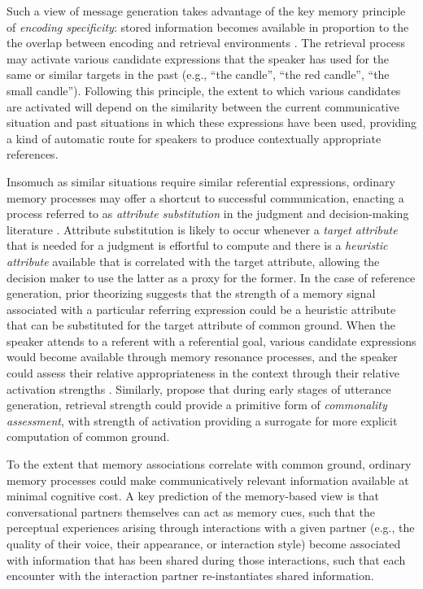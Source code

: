 \documentclass[natbib,doc,a4paper]{apa6}
\begin{document}
Such a view of message generation takes advantage of the key memory principle of \emph{encoding specificity}: stored information becomes available in proportion to the the overlap between encoding and retrieval environments \citep{tulvingthomson73}.  The retrieval process may activate various candidate expressions that the speaker has used for the same or similar targets in the past (e.g., ``the candle'', ``the red candle'', ``the small candle'').  Following this principle, the extent to which various candidates are activated will depend on the similarity between the current communicative situation and past situations in which these expressions have been used, providing a kind of automatic route for speakers to produce contextually appropriate references. 

Insomuch as similar situations require similar referential expressions, ordinary memory processes may offer a shortcut to successful communication, enacting a process referred to as \emph{attribute substitution} in the judgment and decision-making literature \citep{KahnemanFrederick2002}.  Attribute substitution is likely to occur whenever a \emph{target attribute} that is needed for a judgment is effortful to compute and there is a \emph{heuristic attribute} available that is correlated with the target attribute, allowing the decision maker to use the latter as a proxy for the former.  In the case of reference generation, prior theorizing suggests that the strength of a memory signal associated with a particular referring expression could be a heuristic attribute that can be substituted for the target attribute of common ground.  When the speaker attends to a referent with a referential goal, various candidate expressions would become available through memory resonance processes, and the speaker could assess their relative appropriateness in the context through their relative activation strengths \citep{GannBarr2014}.  Similarly, \citet{horton_gerrig_2016} propose that during early stages of utterance generation, retrieval strength could provide a primitive form of \emph{commonality assessment}, with strength of activation providing a surrogate for more explicit computation of common ground.

To the extent that memory associations correlate with common ground, ordinary memory processes could make communicatively relevant information available at minimal cognitive cost.  A key prediction of the memory-based view is that conversational partners themselves can act as memory cues, such that the perceptual experiences arising through interactions with a given partner (e.g., the quality of their voice, their appearance, or interaction style) become associated with information that has been shared during those interactions, such that each encounter with the interaction partner re-instantiates shared information.
\end{document}
